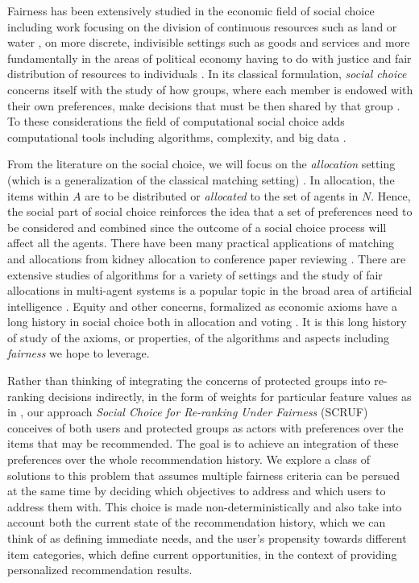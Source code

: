 Fairness has been extensively studied in the economic field of social choice including work focusing on the division of continuous resources such as land or water \cite{Moulin:FairDivision}, on more discrete, indivisible settings such as goods and services \cite{Thomson:FairRules,Thomson:IntroFairAllocation} and more fundamentally in the areas of political economy having to do with justice and fair distribution of resources to individuals \cite{Young:Equity,Rawls:Justice,Rescher:Justice}. In its classical formulation, \emph{social choice} concerns itself with the study of how groups, where each member is endowed with their own preferences, make decisions that must be then shared by that group \cite{Sen:CollectiveChoice}. To these considerations the field of computational social choice adds computational tools including algorithms, complexity, and big data \cite{BCELP16a,DBLP:conf/ijcai/Mattei20}.


From the literature on the social choice, we will focus on the \emph{allocation} setting (which is a generalization of the classical matching setting) \cite{BCELP16a}. In allocation, the items within $A$ are to be distributed or \emph{allocated} to the set of agents in $N$.  Hence, the social part of social choice reinforces the idea that a set of preferences need to be considered and combined since the outcome of a social choice process will affect all the agents.  There have been many practical applications of matching and allocations from kidney allocation \cite{Roth:Kidney} to conference paper reviewing \cite{LiMaNoWa18}.  There are extensive studies of algorithms for a variety of settings \cite{Manlove:MatchingPrefs} and the study of fair allocations in multi-agent systems is a popular topic in the broad area of artificial intelligence \cite{Aziz:FairAllocation}. Equity and other concerns, formalized as economic axioms have a long history in social choice both in allocation \cite{Young:Equity} and voting \cite{Zwicker:Voting}. It is this long history of study of the axioms, or properties, of the algorithms and aspects including \emph{fairness} we hope to leverage.

Rather than thinking of integrating the concerns of protected groups into re-ranking decisions indirectly, in the form of weights for particular feature values as in \cite{sonboli-umap-2020}, our approach \textit{Social Choice for Re-ranking Under Fairness} (SCRUF) conceives of both users and protected groups as actors with preferences over the items that may be recommended. The goal is to achieve an integration of these preferences over the whole recommendation history. We explore a class of solutions to this problem that assumes multiple fairness criteria can be persued at the same time by deciding which objectives to address and which users to address them with.  This choice is made non-deterministically and also take into account both the current state of the recommendation history, which we can think of as defining immediate needs, and the user's propensity towards different item categories, which define current opportunities, in the context of providing personalized recommendation results. 

